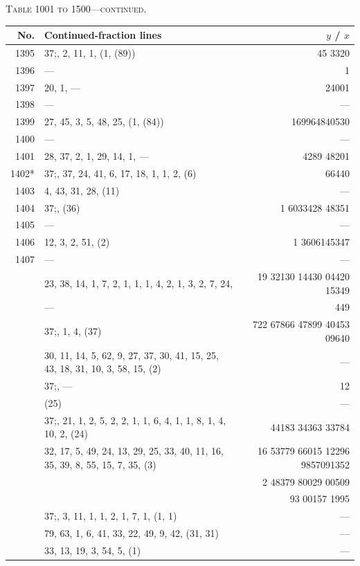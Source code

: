 \documentclass[11pt]{article}
\newcommand{\peheading}{%
  \begin{center}\small\textsc{Table 1001 to 1500---continued.}\end{center}
}
\begin{document}
\peheading
\renewcommand{\arraystretch}{1.15}
{\footnotesize
\begin{longtable}{|r|p{8.5cm}|r|}
\hline
\textbf{No.} & \textbf{Continued-fraction lines} & \textbf{$y$ \;/\; $x$}\\
\hline\endhead
1395   & $37$;\; 26, 2, 11, 1, (1, (89)) & 45 3320 \\
1396   & --- & 1 \\
1397   & 20, 1, --- & 24001 \\
1398   & --- & --- \\
1399   & 27, 45, 3, 5, 48, 25, (1, (84)) & 169964840530 \\
1400   & --- & --- \\
1401   & 28, 37, 2, 1, 29, 14, 1, --- & 4289 48201 \\
1402*  & $37$;\; 2, 37, 24, 41, 6, 17, 18, 1, 1, 2, (6) & 66440 \\
1403   & 4, 43, 31, 28, (11) & --- \\
1404   & $37$;\; 1, (36) & 1 6033428 48351 \\
1405   & --- & --- \\
1406   & 12, 3, 2, 51, (2) & 1 3606145347 \\
1407   & --- & --- \\
       & 23, 38, 14, 1, 7, 2, 1, 1, 1, 4, 2, 1, 3, 2, 7, 24, & 19 32130 14430 04420 15349 \\
       & --- & 449 \\
       & $37$;\; 2, 1, 4, (37) & 722 67866 47899 40453 09640 \\
\hline
       & 30, 11, 14, 5, 62, 9, 27, 37, 30, 41, 15, 25, 43, 18, 31, 10, 3, 58, 15, (2) & --- \\
       & $37$;\; 2, --- & 12 \\
       & (25) & --- \\
       & $37$;\; 2, 21, 1, 2, 5, 2, 2, 1, 1, 6, 4, 1, 1, 8, 1, 4, 10, 2, (24) & 44183 34363 33784 \\
       & 32, 17, 5, 49, 24, 13, 29, 25, 33, 40, 11, 16, 35, 39, 8, 55, 15, 7, 35, (3) & 16 53779 66015 12296 9857091352 \\
       & & 2 48379 80029 00509 \\
       & & 93 00157 1995 \\
\hline
       & $37$;\; 2, 3, 11, 1, 1, 2, 1, 7, 1, (1, 1) & --- \\
       & 79, 63, 1, 6, 41, 33, 22, 49, 9, 42, (31, 31) & --- \\
       & 33, 13, 19, 3, 54, 5, (1) & --- \\

\end{longtable}}
\end{document}
